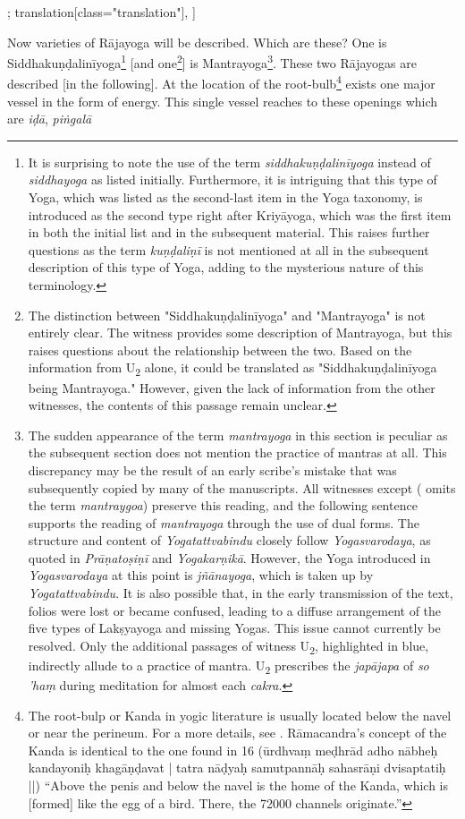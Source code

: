\begin{alignment}[
    texts=edition[class="edition"];
    translation[class="translation"],
  ]
\begin{translation}
\begin{tlate}
      \noindent Now varieties of Rājayoga will be described. Which are these? One is Siddhakuṇḍalinīyoga\footnote{It is surprising to note the use of the term \textit{siddhakuṇḍalinīyoga} instead of \textit{siddhayoga} as listed initially. Furthermore, it is intriguing that this type of Yoga, which was listed as the second-last item in the Yoga taxonomy, is introduced as the second type right after Kriyāyoga, which was the first item in both the initial list and in the subsequent material. This raises further questions as the term \textit{kuṇḍaliṇī} is not mentioned at all in the subsequent description of this type of Yoga, adding to the mysterious nature of this terminology.} [and one\footnote{The distinction between "Siddhakuṇḍalinīyoga" and "Mantrayoga" is not entirely clear. The witness  provides some description of Mantrayoga, but this raises questions about the relationship between the two. Based on the information from U\textsubscript{2} alone, it could be translated as "Siddhakuṇḍalinīyoga being Mantrayoga." However, given the lack of information from the other witnesses, the contents of this passage remain unclear.}] is Mantrayoga\footnote{The sudden appearance of the term \textit{mantrayoga} in this section is peculiar as the subsequent section does not mention the practice of mantras at all. This discrepancy may be the result of an early scribe's mistake that was subsequently copied by many of the manuscripts. All witnesses except  ( omits the term \textit{mantraygoa}) preserve this reading, and the following sentence supports the reading of \textit{mantrayoga} through the use of dual forms. The structure and content of \textit{Yogatattvabindu} closely follow \textit{Yogasvarodaya}, as quoted in \textit{Prāṇatoṣiṇī} and \textit{Yogakarṇikā}. However, the Yoga introduced in \textit{Yogasvarodaya} at this point is \textit{jñānayoga}, which is taken up by \textit{Yogatattvabindu}. It is also possible that, in the early transmission of the text, folios were lost or became confused, leading to a diffuse arrangement of the five types of Lakṣyayoga and missing Yogas. This issue cannot currently be resolved. Only the additional passages of witness U\textsubscript{2}, highlighted in blue, indirectly allude to a practice of mantra. U\textsubscript{2} prescribes the \textit{japājapa} of \textit{so 'haṃ} during meditation for almost each \textit{cakra}.}. These two Rājayogas are described [in the following]. At the location of the root-bulb\footnote{The root-bulp or Kanda in yogic literature is usually located below the navel or near the perineum. For a more details, see \pageref{antaralaksya}. Rāmacandra's concept of the Kanda is identical to the one found in  16 (ūrdhvaṃ meḍhrād adho nābheḥ kandayoniḥ khagāṇḍavat | tatra nāḍyaḥ samutpannāḥ sahasrāṇi dvisaptatiḥ ||) ``Above the penis and below the navel is the home of the Kanda, which is [formed] like the egg of a bird. There, the 72000 channels originate.''} exists one major vessel in the form of energy.\textsuperscript{\coro{[\lowroman{5}]}} This single vessel reaches to these openings which are \textit{iḍā}, \textit{piṅgalā} 
\end{tlate}
\end{translation}
\end{alignment}
